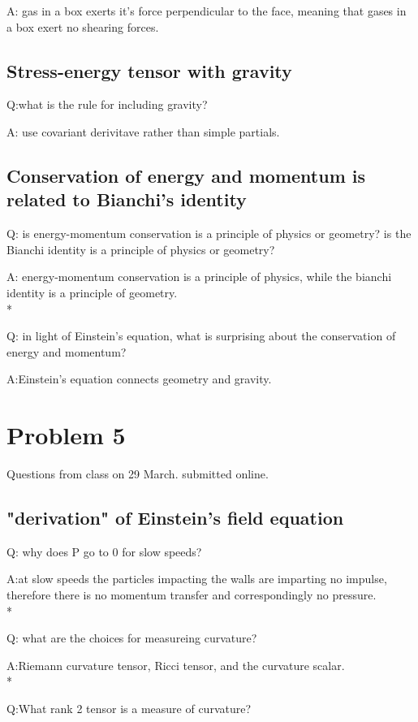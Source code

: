 \documentclass{article}
\begin{document}
A: gas in a box exerts it's force perpendicular to the face, meaning that gases in a box exert no shearing forces. 
\subsection{Stress-energy tensor with gravity}
\hspace{0.5cm}Q:what is the rule for including gravity? 

A: use covariant derivitave rather than simple partials. 
\subsection{Conservation of energy and momentum is related to Bianchi's identity}
\hspace{0.5cm}Q: is energy-momentum conservation is a principle of physics or geometry? is the Bianchi identity is a principle of physics or geometry?

A: energy-momentum conservation is a principle of physics, while the bianchi identity is a principle of geometry.
\\*

Q: in light of Einstein's equation, what is surprising about the conservation of energy and momentum?

A:Einstein's equation connects geometry and gravity. 

\section{Problem 5}

Questions from class on 29 March. submitted online.
\subsection{"derivation" of Einstein's field equation}
\hspace{0.5cm}Q: why does P go to 0 for slow speeds?

A:at slow speeds the particles impacting the walls are imparting no impulse, therefore there is no momentum transfer and correspondingly no pressure.
\\*

Q: what are the choices for measureing curvature? 

A:Riemann curvature tensor, Ricci tensor, and the curvature scalar.
\\*

Q:What rank 2 tensor is a measure of curvature?
\end{document}
